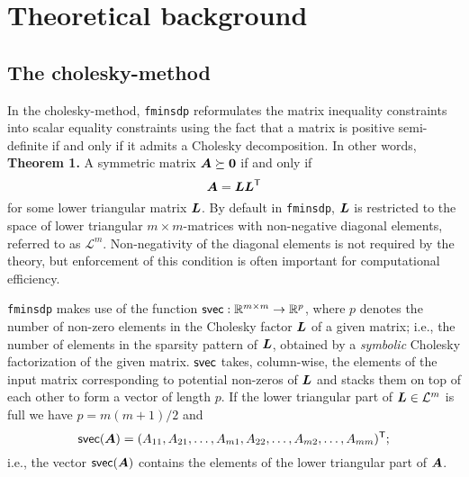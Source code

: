 \documentclass{article}
\newcommand{\bm}[1]{\mbox{\boldmath $#1$}}
\newcommand{\T}{\textsf{T}}
\newcommand{\svec}{\mbox{\textsf{svec}}}
\begin{document}
\section{Theoretical background}

\subsection{The cholesky-method}

In the cholesky-method, \texttt{fminsdp} reformulates the matrix inequality constraints into scalar equality constraints using the fact that a matrix is positive semi-definite if and only if it admits a Cholesky decomposition. In other words, 
\vskip 2mm
\noindent \textbf{Theorem 1.} A symmetric matrix $\bm{A} \succeq \bm{0}$ if and only if
\begin{equation}\nonumber
\bm{A} = \bm{L}\bm{L}^{\T}
\end{equation}
for some lower triangular matrix $\bm{L}$. 
\vskip 2mm
\noindent By default in \texttt{fminsdp}, $\bm{L}$ is restricted to the space of lower triangular $m \times m$-matrices with non-negative diagonal elements, referred to as $\mathcal{L}^{m}$. Non-negativity of the diagonal elements is not required by the theory, but enforcement of this condition is often important for computational efficiency.

\texttt{fminsdp} makes use of the function $\svec : \mathbb{R}^{m\times m} \rightarrow \mathbb{R}^{p}$, where $p$ denotes the number of  non-zero elements in the Cholesky factor $\bm{L}$ of a given matrix; i.e., the number of elements in the sparsity pattern of $\bm{L}$, obtained by a \textit{symbolic} Cholesky factorization of the given matrix. $\svec$ takes, column-wise, the elements of the input matrix corresponding to potential non-zeros of $\bm{L}$ and stacks them on top of each other to form a vector of length $p$. If the lower triangular part of $\bm{L}\in\mathcal{L}^{m}$ is full we have $p=m(m+1)/2$ and
\begin{equation}\nonumber
\svec(\bm{A}) = (A_{11},A_{21},\ldots,A_{m1},A_{22},\ldots,A_{m2},\ldots,A_{mm})^{\T};
\end{equation}
i.e., the vector $\svec(\bm{A})$ contains the elements of the lower triangular part of $\bm{A}$. 
\end{document}
